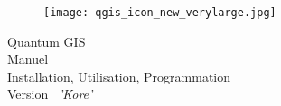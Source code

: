 \begin{titlepage}
\begin{center}

\begin{figure}[H]
\begin{center}
\texttt{[image: qgis\_icon\_new\_verylarge.jpg]} 
\end{center}
\end{figure}

\Huge{Quantum GIS}\\
\vspace{0.5cm}
\Large{Manuel \\Installation, Utilisation, Programmation} \\
\vspace{0.5cm}
\Large{Version ~\CURRENT \textsl{'Kore'}}

\end{center}
\end{titlepage}
